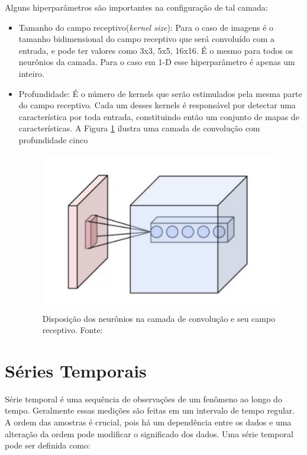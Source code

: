 Alguns hiperparâmetros são importantes na configuração de tal camada:

\begin{itemize}
	\item Tamanho do campo receptivo(\textit{kernel size}): Para o caso de imagens é o tamanho bidimensional do campo receptivo que será convoluído com a entrada, e pode ter valores como 3x3, 5x5, 16x16. É o mesmo para todos os neurônios da camada. Para o caso em 1-D esse hiperparâmetro  é apenas um inteiro.
	\item Profundidade: É o número de kernels que serão estimulados pela mesma parte do campo receptivo. Cada um desses kernels é responsável por detectar uma característica por toda entrada, constituindo então um conjunto de mapas de características. A Figura \ref{fig-depth} ilustra uma camada de convolução com profundidade cinco
	
	\begin{figure}[h]
		\centering
		\includegraphics[scale=0.4]{pasta1_figuras/depth_cnn.png}
		\caption{Disposição dos neurônios na camada de convolução e seu campo receptivo. Fonte: \citeauthor{depth} }
		
		\label{fig-depth}
	\end{figure}
		
\end{itemize}
\section{Séries Temporais}

Série temporal é uma sequência de observações de um fenômeno ao longo do tempo. Geralmente essas medições são feitas em um intervalo de tempo regular. A ordem das amostras é crucial, pois há um dependência entre os dados e uma alteração da ordem pode modificar o significado dos dados. Uma série temporal pode ser definida como:

